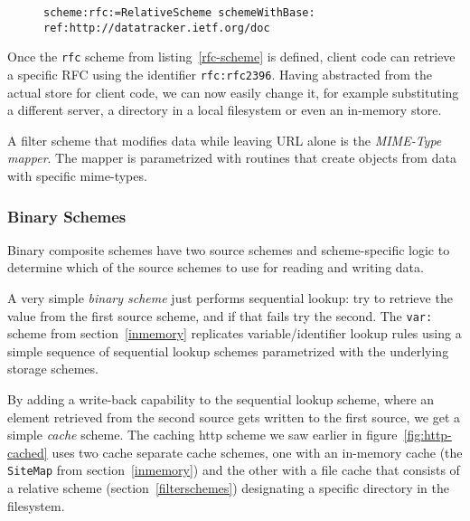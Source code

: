 \documentclass[preprint,authoryear]{llncs}
\begin{document}
\begin{figure}[htbp]
\begin{lstlisting}[style=L,label=rfc-scheme,caption=Defining a custom rfc: scheme.]
scheme:rfc:=RelativeScheme schemeWithBase: ref:http://datatracker.ietf.org/doc
\end{lstlisting}
\end{figure}

Once the {\tt rfc} scheme from listing~\ref{rfc-scheme} is defined, client code can 
retrieve a specific RFC using the identifier {\tt  rfc:rfc2396}.  Having abstracted
from the actual store for client code, we can now easily change it, for example
substituting a different server, a directory in a local filesystem or even an 
in-memory store.




A filter scheme that modifies data while leaving URL alone is the \emph{MIME-Type mapper}.
The mapper is parametrized with routines that create objects from data with specific
mime-types.  


\subsubsection{Binary Schemes}

Binary composite schemes have two source schemes and scheme-specific logic
to determine which of the source schemes to use for reading and writing data.

A very simple \emph{binary scheme} just performs sequential lookup:  try to
retrieve the value from the first source scheme, and if that fails try the second.
The {\tt var:} scheme from section~\ref{inmemory}  replicates variable/identifier
lookup rules using a simple sequence of sequential lookup schemes parametrized
with the underlying storage schemes.

By adding a write-back capability to the sequential lookup scheme, where an element
retrieved from the second source gets written to the first source, we get a simple \emph{cache} scheme.  
The caching http scheme we saw earlier in figure~\ref{fig:http-cached} uses two cache
separate cache schemes, one with an in-memory cache (the {\tt SiteMap} from section~\ref{inmemory})
and the other with a file cache that consists of a relative scheme (section~\ref{filterschemes}) 
designating a specific directory in the filesystem.
\end{document}
